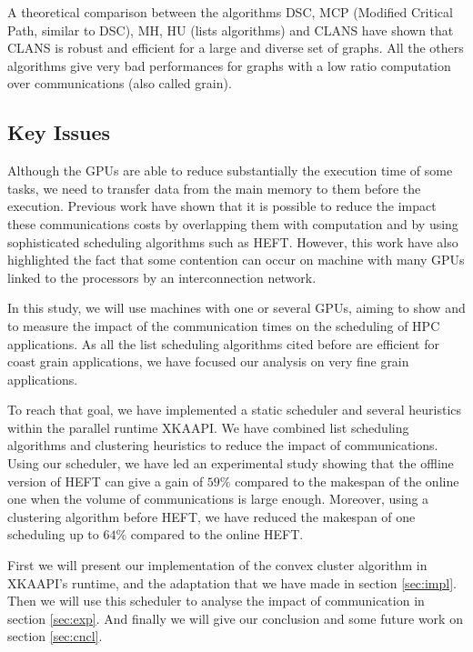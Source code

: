 \documentclass[10pt, conference, compsocconf,pdftex,dvipsnames]{IEEEtran}
\begin{document}
A theoretical comparison\cite{khan1994comparison} between the algorithms DSC,
MCP (Modified Critical Path, similar to DSC), MH, HU (lists algorithms) and
CLANS have shown that CLANS is robust and efficient for a large and diverse
set of graphs. All the others algorithms give very bad performances for graphs
with a low ratio computation over communications (also called grain). 

\subsection{Key Issues}

Although the GPUs are able to reduce substantially the execution time of
some tasks, we need to transfer data from the main memory to them before
the execution. Previous work\cite{ferreiralima:hal-00735470} have shown
that it is possible to reduce the impact these communications costs by
overlapping them with computation and by using sophisticated scheduling
algorithms such as HEFT.  However, this work have also highlighted the
fact that some contention can occur on machine with many GPUs linked to
the processors by an interconnection network.

In this study, we will use machines with one or several GPUs, aiming to
show and to measure the impact of the communication times on the
scheduling of HPC applications. As all the list scheduling algorithms cited
before are efficient for coast grain applications, we have focused our
analysis on very fine grain applications. 

To reach that goal, we have implemented a static scheduler and several
heuristics within the parallel runtime XKAAPI. We have combined list
scheduling algorithms and clustering heuristics to reduce the impact of
communications. Using our scheduler, we have led an experimental study
showing that the offline version of HEFT can give a gain of $59\%$
compared to the makespan of the online one when the volume of
communications is large enough. Moreover, using a clustering algorithm
before HEFT, we have reduced the makespan of one scheduling up to $64\%$
compared to the online HEFT.

First we will present our implementation of the convex cluster algorithm in
XKAAPI's runtime, and the adaptation that we have made in section
\ref{sec:impl}. Then we will use this scheduler to analyse the impact of
communication in section \ref{sec:exp}. And finally we will give our
conclusion and some future work on section \ref{sec:cncl}.
\end{document}
